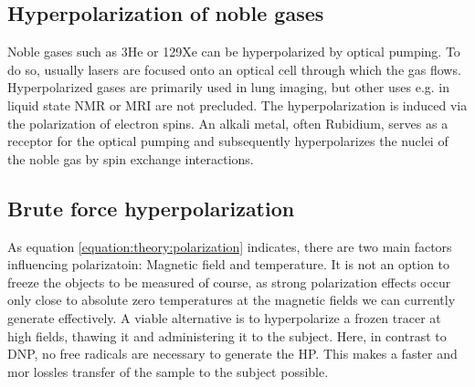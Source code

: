         \subsection{Hyperpolarization of noble gases}
            Noble gases such as 3He or 129Xe can be hyperpolarized by optical pumping. To do so, usually lasers are focused onto an optical cell through which the gas flows. Hyperpolarized gases are primarily used in lung imaging, but other uses e.g. in liquid state NMR or MRI are not precluded.
            The hyperpolarization is induced via the polarization of electron spins. An alkali metal, often Rubidium, serves as a receptor for the optical pumping and subsequently hyperpolarizes the nuclei of the noble gas by spin exchange interactions.
        \subsection{Brute force hyperpolarization}
            As equation \ref{equation:theory:polarization} indicates, there are two main factors influencing polarizatoin: Magnetic field and temperature. It is not an option to freeze the objects to be measured of course, as strong polarization effects occur only close to absolute zero temperatures at the magnetic fields we can currently generate effectively. A viable alternative is to hyperpolarize a frozen tracer at high fields, thawing it and administering it to the subject. Here, in contrast to DNP, no free radicals are necessary to generate the HP. This makes a faster and mor lossles transfer of the sample to the subject possible.
